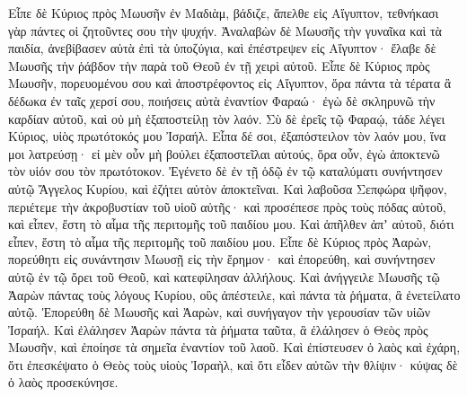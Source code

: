 {Εἶπε δὲ Κύριος πρὸς Μωυσῆν ἐν Μαδιὰμ, βάδιζε, ἄπελθε εἰς Αἴγυπτον, τεθνήκασι γὰρ πάντες οἱ ζητοῦντες σου τὴν ψυχήν.
Ἀναλαβὼν δὲ Μωυσῆς τὴν γυναῖκα καὶ τὰ παιδία, ἀνεβίβασεν αὐτὰ ἐπὶ τὰ ὑποζύγια, καὶ ἐπέστρεψεν εἰς Αἴγυπτον· ἔλαβε δὲ Μωυσῆς τὴν ῥάβδον τὴν παρὰ τοῦ Θεοῦ ἐν τῇ χειρὶ αὐτοῦ.
Εἶπε δὲ Κύριος πρὸς Μωυσῆν, πορευομένου σου καὶ ἀποστρέφοντος εἰς Αἴγυπτον, ὅρα πάντα τὰ τέρατα ἃ δέδωκα ἐν ταῖς χερσί σου, ποιήσεις αὐτὰ ἐναντίον Φαραώ· ἐγὼ δὲ σκληρυνῶ τὴν καρδίαν αὐτοῦ, καὶ οὐ μὴ ἐξαποστείλῃ τὸν λαόν.
Σὺ δὲ ἐρεῖς τῷ Φαραῴ, τάδε λέγει Κύριος, υἱὸς πρωτότοκός μου Ἰσραήλ.
Εἶπα δέ σοι, ἐξαπόστειλον τὸν λαόν μου, ἵνα μοι λατρεύσῃ· εἰ μὲν οὖν μὴ βούλει ἐξαποστεῖλαι αὐτούς, ὅρα οὖν, ἐγὼ ἀποκτενῶ τὸν υἱόν σου τὸν πρωτότοκον.
Ἐγένετο δὲ ἐν τῇ ὁδῷ ἐν τῷ καταλύματι συνήντησεν αὐτῷ Ἄγγελος Κυρίου, καὶ ἐζήτει αὐτὸν ἀποκτεῖναι.
Καὶ λαβοῦσα Σεπφώρα ψῆφον, περιέτεμε τὴν ἀκροβυστίαν τοῦ υἱοῦ αὐτῆς· καὶ προσέπεσε πρὸς τοὺς πόδας αὐτοῦ, καὶ εἶπεν, ἔστη τὸ αἷμα τῆς περιτομῆς τοῦ παιδίου μου.
Καὶ ἀπῆλθεν ἀπʼ αὐτοῦ, διότι εἶπεν, ἔστη τὸ αἷμα τῆς περιτομῆς τοῦ παιδίου μου.
Εἶπε δὲ Κύριος πρὸς Ἀαρὼν, πορεύθητι εἰς συνάντησιν Μωυσῇ εἰς τὴν ἔρημον· καὶ ἐπορεύθη, καὶ συνήντησεν αὐτῷ ἐν τῷ ὄρει τοῦ Θεοῦ, καὶ κατεφίλησαν ἀλλήλους.
Καὶ ἀνήγγειλε Μωυσῆς τῷ Ἀαρὼν πάντας τοὺς λόγους Κυρίου, οὓς ἀπέστειλε, καὶ πάντα τὰ ῥήματα, ἃ ἐνετείλατο αὐτῷ.
Ἐπορεύθη δὲ Μωυσῆς καὶ Ἀαρὼν, καὶ συνήγαγον τὴν γερουσίαν τῶν υἱῶν Ἰσραήλ.
Καὶ ἐλάλησεν Ἀαρὼν πάντα τὰ ῥήματα ταῦτα, ἃ ἐλάλησεν ὁ Θεὸς πρὸς Μωυσῆν, καὶ ἐποίησε τὰ σημεῖα ἐναντίον τοῦ λαοῦ.
Καὶ ἐπίστευσεν ὁ λαὸς καὶ ἐχάρη, ὅτι ἐπεσκέψατο ὁ Θεὸς τοὺς υἱοὺς Ἰσραὴλ, καὶ ὅτι εἶδεν αὐτῶν τὴν θλίψιν· κύψας δὲ ὁ λαὸς προσεκύνησε.

}
